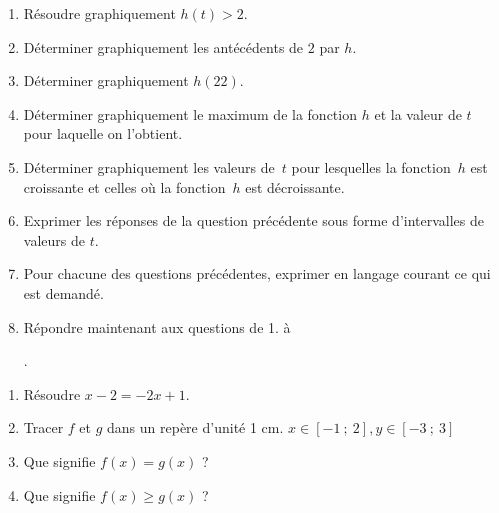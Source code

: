 \setcounter{exercice}{0}
\setcounter{probleme}{0}
\exercice %
	\begin{enumerate}
		\item Résoudre graphiquement $h(t) > 2$.
		\item Déterminer graphiquement les antécédents de $2$ par $h$.
		\item Déterminer graphiquement $h(22)$.
		\item Déterminer graphiquement le maximum de la fonction $h$ et la valeur de $t$ pour laquelle on l'obtient.
		\item Déterminer graphiquement les valeurs de~$t$ pour lesquelles la fonction~$h$ est croissante et celles où la fonction~$h$ est décroissante.
		\item Exprimer les réponses de la question précédente sous forme d'intervalles de valeurs de $t$.
		\item Pour chacune des questions précédentes, exprimer en langage courant ce qui est demandé.
		\item Répondre maintenant aux questions de 1. à \addtocounter{enumi}{-2}\theenumi \addtocounter{enumi}{2}.
	\end{enumerate}
\exercice %
	\begin{enumerate}
		\item Résoudre $x - 2 = -2x + 1$.
		\item Tracer $f$ et $g$ dans un repère d'unité 1 cm. $x \in \left[-1~;~2\right], y \in \left[-3~;~3\right]$
		\item Que signifie $f(x) = g(x)$ ?
		\item Que signifie $f(x) \geqslant g(x)$ ?
	\end{enumerate}
\exercice %
\exercice %
\exercice %
\exerciceprime 
\exercice %
\exercice %
\exerciceprime


\exercice %
\exercice %
\exercice %


\exercice %
\exercice %
\exerciceprime


\exercice %
\exerciceprime
\exercice %


\exercice %

\probleme %
\probleme %


